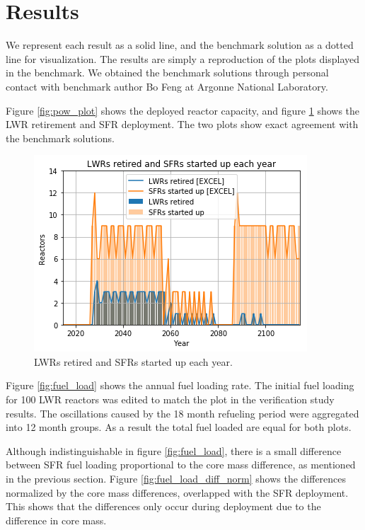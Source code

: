 \section{Results}

We represent each \Cyclus result as a solid line, and the benchmark solution
as a dotted line for visualization. The results are
simply a reproduction of the plots displayed in the benchmark. 
We obtained the benchmark solutions through personal contact with
benchmark author Bo Feng at Argonne National Laboratory.


Figure \ref{fig:pow_plot} shows the deployed reactor capacity, and
figure \ref{fig:dep} shows the \gls{LWR} retirement and \gls{SFR}
deployment. The two plots show exact agreement with the
benchmark solutions.



\begin{figure}[htbp!]
	\begin{center}
		\includegraphics[scale=0.5]{./images/results_18/dep.png}
	\end{center}
        \caption{\glspl{LWR} retired and \glspl{SFR} started up each year.}
	\label{fig:dep}
\end{figure}

Figure \ref{fig:fuel_load} shows the annual fuel loading rate.
The initial fuel loading for 100 \gls{LWR} reactors was edited to match
the plot in the verification
study results. The oscillations caused by the 18 month refueling period
were aggregated into 12 month groups. As a result the total fuel loaded
are equal for both plots.

Although indistinguishable in figure \ref{fig:fuel_load},
there is a small difference between \gls{SFR} fuel loading proportional
to the core mass difference, as mentioned in the previous section.
Figure \ref{fig:fuel_load_diff_norm} shows the
differences normalized by the core mass differences, overlapped with the
\gls{SFR} deployment. This shows that the differences only occur during
deployment due to the difference in core mass.


